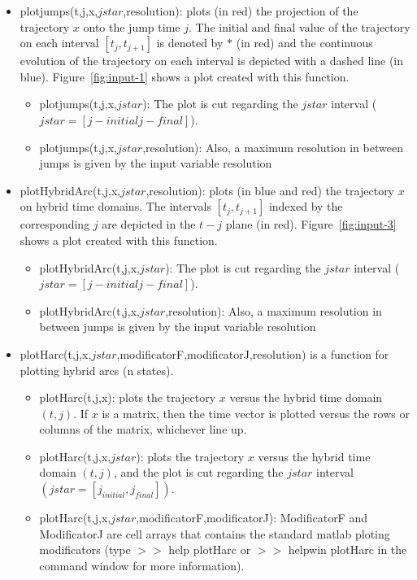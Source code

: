 \documentclass{article}
\begin{document}
\begin{itemize}
\begin{itemize}
 \end{itemize}
\item plotjumps(t,j,x,$jstar$,resolution): plots (in red) the projection of the
  trajectory $x$ onto the jump time $j$. The initial and final value
  of the trajectory on each interval $[t_j,t_{j+1}]$ is denoted by
  $*$ (in red) and the continuous evolution of the trajectory on
  each interval is depicted with a dashed line (in blue). Figure~\ref{fig:input-1} shows a plot created with this function.
 \begin{itemize}
 	\item plotjumps(t,j,x,$jstar$): The plot is cut regarding the $jstar$ interval ($jstar = [j-initial j-final]$).
	\item plotjumps(t,j,x,$jstar$,resolution): Also, a maximum resolution in between jumps is given by the input variable resolution
 \end{itemize}

\item plotHybridArc(t,j,x,$jstar$,resolution): plots (in blue and red) the trajectory $x$ on hybrid
time domains. The intervals $[t_j,t_{j+1}]$ indexed by the
corresponding $j$ are depicted in the $t-j$ plane (in red). Figure~\ref{fig:input-3} shows a plot created with this function.
 \begin{itemize}
 	\item plotHybridArc(t,j,x,$jstar$): The plot is cut regarding the $jstar$ interval ($jstar = [j-initial j-final]$).
	\item plotHybridArc(t,j,x,$jstar$,resolution): Also, a maximum resolution in between jumps is given by the input variable resolution
 \end{itemize}

\item plotHarc(t,j,x,$jstar$,modificatorF,modificatorJ,resolution) is a function for plotting hybrid arcs (n states).
\begin{itemize}
\item plotHarc(t,j,x): plots the trajectory $x$ versus the hybrid time domain $(t,j)$. If $x$ is a matrix, then the time vector is plotted versus the rows or columns of the matrix, whichever line up.
\item plotHarc(t,j,x,$jstar$): plots the trajectory $x$ versus the hybrid time domain $(t,j)$, and the plot is cut regarding the $jstar$ interval $(jstar = [j_{initial},j_{final}])$.
\item plotHarc(t,j,x,$jstar$,modificatorF,modificatorJ): ModificatorF and ModificatorJ are cell arrays that contains the standard matlab ploting modificators (type $>>$ help plotHarc or $>>$ helpwin plotHarc in the command window for more information).
\end{itemize}


\end{itemize}
\end{document}
